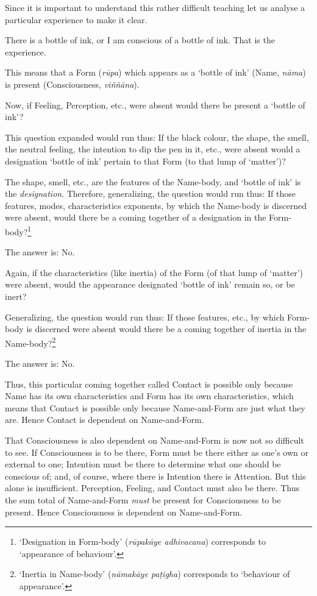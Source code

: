 Since it is important to understand this rather difficult teaching let us analyse a particular experience to make it clear.

There is a bottle of ink, or I am conscious of a bottle of ink. That is the experience.

This means that a Form (\textit{rūpa}) which appears as a `bottle of ink' (Name, \textit{nāma}) is present (Consciousness, \textit{viññāna}).

Now, if Feeling, Perception, etc., were absent would there be present a `bottle of ink'?

This question expanded would run thus: If the black colour, the shape, the smell, the neutral feeling, the intention to dip the pen in it, etc., were absent would a designation `bottle of ink' pertain to that Form (to that lump of `matter')?

The shape, smell, etc., are the features of the Name-body, and `bottle of ink' is the \emph{designation}. Therefore, generalizing, the question would run thus: If those features, modes, characteristics exponents, by which the Name-body is discerned were absent, would there be a coming together of a designation in the Form-body?\footnote{`Designation in Form-body' (\textit{rūpakāye adhivacana}) corresponds to `appearance of behaviour'.}

The answer is: No.

Again, if the characteristics (like inertia) of the Form (of that lump of `matter') were absent, would the appearance designated `bottle of ink' remain so, or be inert?

Generalizing, the question would run thus: If those features, etc., by which Form-body is discerned were absent would there be a coming together of inertia in the Name-body?\footnote{`Inertia in Name-body' (\textit{nāmakāye paṭigha}) corresponds to `behaviour of appearance'.}

The answer is: No.

Thus, this particular coming together called Contact is possible only because Name has its own characteristics and Form has its own characteristics, which means that Contact is possible only because Name-and-Form are just what they are. Hence Contact is dependent on Name-and-Form.

That Consciousness is also dependent on Name-and-Form is now not so difficult to see. If Consciousness is to be there, Form must be there either as one's own or external to one; Intention must be there to determine what one should be conscious of; and, of course, where there is Intention there is Attention. But this alone is insufficient. Perception, Feeling, and Contact must also be there. Thus the sum total of Name-and-Form \emph{must} be present for Consciousness to be present. Hence Consciousness is dependent on Name-and-Form.

